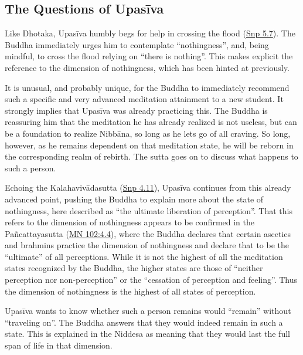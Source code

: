 \documentclass[12pt,openany]{book}%
\begin{document}
\subsection*{The Questions of \textsanskrit{Upasīva}}

Like Dhotaka, \textsanskrit{Upasīva} humbly begs for help in crossing the flood (\href{https://suttacentral.net/snp5.7/en/sujato}{Snp 5.7}). The Buddha immediately urges him to contemplate “nothingness”, and, being mindful, to cross the flood relying on “there is nothing”. This makes explicit the reference to the dimension of nothingness, which has been hinted at previously.

It is unusual, and probably unique, for the Buddha to immediately recommend such a specific and very advanced meditation attainment to a new student. It strongly implies that \textsanskrit{Upasīva} was already practicing this. The Buddha is reassuring him that the meditation he has already realized is not useless, but can be a foundation to realize \textsanskrit{Nibbāna}, so long as he lets go of all craving. So long, however, as he remains dependent on that meditation state, he will be reborn in the corresponding realm of rebirth. The sutta goes on to discuss what happens to such a person.

Echoing the \textsanskrit{Kalahavivādasutta} (\href{https://suttacentral.net/snp4.11/en/sujato}{Snp 4.11}), \textsanskrit{Upasīva} continues from this already advanced point, pushing the Buddha to explain more about the state of nothingness, here described as “the ultimate liberation of perception”. That this refers to the dimension of nothingness appears to be confirmed in the \textsanskrit{Pañcattayasutta} (\href{https://suttacentral.net/mn102/en/sujato\#4.4}{MN 102:4.4}), where the Buddha declares that certain ascetics and brahmins practice the dimension of nothingness and declare that to be the “ultimate” of all perceptions. While it is not the highest of all the meditation states recognized by the Buddha, the higher states are those of “neither perception nor non-perception” or the “cessation of perception and feeling”. Thus the dimension of nothingness is the highest of all states of perception.

\textsanskrit{Upasīva} wants to know whether such a person remains would “remain” without “traveling on”. The Buddha answers that they would indeed remain in such a state. This is explained in the Niddesa as meaning that they would last the full span of life in that dimension.
\end{document}
